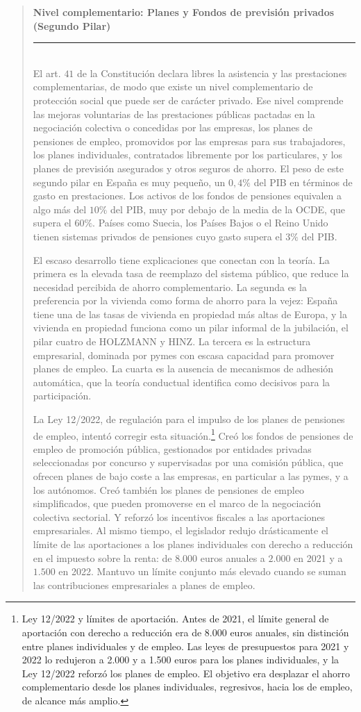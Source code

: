 \documentclass[10pt,a4paper]{article}
\newenvironment{specialblock}[1]{%
      \begin{quote} %
      \small %
      \noindent\textbf{#1}\\[-0.3em] %
      \rule{\linewidth}{0.4pt}\\[0.6em]}{
      \end{quote}}
\begin{document}
\begin{specialblock}{\textbf{Nivel complementario}: Planes y Fondos de previsión privados (Segundo Pilar)}
    El art. $41$ de la Constitución declara libres la asistencia y las prestaciones complementarias, de modo que existe un nivel complementario de protección social que puede ser de carácter privado. Ese nivel comprende las mejoras voluntarias de las prestaciones públicas pactadas en la negociación colectiva o concedidas por las empresas, los planes de pensiones de empleo, promovidos por las empresas para sus trabajadores, los planes individuales, contratados libremente por los particulares, y los planes de previsión asegurados y otros seguros de ahorro. El peso de este segundo pilar en España es muy pequeño, un $0,4\%$ del PIB en términos de gasto en prestaciones. Los activos de los fondos de pensiones equivalen a algo más del $10\%$ del PIB, muy por debajo de la media de la OCDE, que supera el $60\%$. Países como Suecia, los Países Bajos o el Reino Unido tienen sistemas privados de pensiones cuyo gasto supera el $3\%$ del PIB.

    El escaso desarrollo tiene explicaciones que conectan con la teoría. La primera es la elevada tasa de reemplazo del sistema público, que reduce la necesidad percibida de ahorro complementario. La segunda es la preferencia por la vivienda como forma de ahorro para la vejez: España tiene una de las tasas de vivienda en propiedad más altas de Europa, y la vivienda en propiedad funciona como un pilar informal de la jubilación, el pilar cuatro de HOLZMANN y HINZ. La tercera es la estructura empresarial, dominada por pymes con escasa capacidad para promover planes de empleo. La cuarta es la ausencia de mecanismos de adhesión automática, que la teoría conductual identifica como decisivos para la participación.
    
    La Ley 12/2022, de regulación para el impulso de los planes de pensiones de empleo, intentó corregir esta situación.\footnote{Ley 12/2022 y límites de aportación. Antes de 2021, el límite general de aportación con derecho a reducción era de 8.000 euros anuales, sin distinción entre planes individuales y de empleo. Las leyes de presupuestos para 2021 y 2022 lo redujeron a 2.000 y a 1.500 euros para los planes individuales, y la Ley 12/2022 reforzó los planes de empleo. El objetivo era desplazar el ahorro complementario desde los planes individuales, regresivos, hacia los de empleo, de alcance más amplio.
    } Creó los fondos de pensiones de empleo de promoción pública, gestionados por entidades privadas seleccionadas por concurso y supervisadas por una comisión pública, que ofrecen planes de bajo coste a las empresas, en particular a las pymes, y a los autónomos. Creó también los planes de pensiones de empleo simplificados, que pueden promoverse en el marco de la negociación colectiva sectorial. Y reforzó los incentivos fiscales a las aportaciones empresariales. Al mismo tiempo, el legislador redujo drásticamente el límite de las aportaciones a los planes individuales con derecho a reducción en el impuesto sobre la renta: de $8.000$ euros anuales a $2.000$ en 2021 y a $1.500$ en 2022. Mantuvo un límite conjunto más elevado cuando se suman las contribuciones empresariales a planes de empleo.
    

\end{specialblock}
\end{document}
